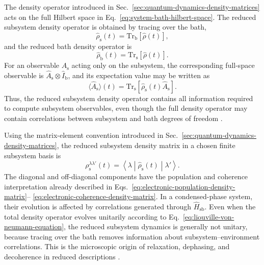 \documentclass[
  11pt,
  letterpaper,
  onehalfspacing,
  normalmargins,
  equalmargins,
  oneside
]{ut-thesis}
\begin{document}
The density operator introduced in
Sec.~\ref{sec:quantum-dynamics-density-matrices} acts on the full Hilbert
space in Eq.~\eqref{eq:system-bath-hilbert-space}. The reduced subsystem
density operator is obtained by tracing over the bath,
\begin{equation}
\hat\rho_{\mathrm s}(t)
=
\mathrm{Tr}_{\mathrm b}
\left[
\hat\rho(t)
\right],
\label{eq:reduced-subsystem-density-operator}
\end{equation}
and the reduced bath density operator is
\begin{equation}
\hat\rho_{\mathrm b}(t)
=
\mathrm{Tr}_{\mathrm s}
\left[
\hat\rho(t)
\right].
\label{eq:reduced-bath-density-operator}
\end{equation}
For an observable \(\hat A_{\mathrm s}\) acting only on the subsystem, the
corresponding full-space observable is
\(\hat A_{\mathrm s}\otimes \hat I_{\mathrm b}\), and its expectation value
may be written as
\begin{equation}
\langle \hat A_{\mathrm s}\rangle(t)
=
\mathrm{Tr}_{\mathrm s}
\left[
\hat\rho_{\mathrm s}(t)\hat A_{\mathrm s}
\right].
\label{eq:subsystem-observable-density}
\end{equation}
Thus, the reduced subsystem density operator contains all information required
to compute subsystem observables, even though the full density operator may
contain correlations between subsystem and bath degrees of freedom
\cite{BreuerPetruccione2002,Blum2012}.

Using the matrix-element convention introduced in
Sec.~\ref{sec:quantum-dynamics-density-matrices}, the reduced subsystem
density matrix in a chosen finite subsystem basis is
\begin{equation}
\rho_{\mathrm s}^{\lambda\lambda'}(t)
=
\left\langle
\lambda
\middle|
\hat\rho_{\mathrm s}(t)
\middle|
\lambda'
\right\rangle .
\label{eq:subsystem-density-matrix-elements}
\end{equation}
The diagonal and off-diagonal components have the population and coherence
interpretation already described in
Eqs.~\eqref{eq:electronic-population-density-matrix}--
\eqref{eq:electronic-coherence-density-matrix}. In a condensed-phase system,
their evolution is affected by correlations generated through
\(\hat H_{\mathrm{sb}}\). Even when the total density operator evolves
unitarily according to Eq.~\eqref{eq:liouville-von-neumann-equation}, the
reduced subsystem dynamics is generally not unitary, because tracing over the
bath removes information about subsystem--environment correlations. This is
the microscopic origin of relaxation, dephasing, and decoherence in reduced
descriptions \cite{BreuerPetruccione2002,Leggett1987}.
\end{document}
